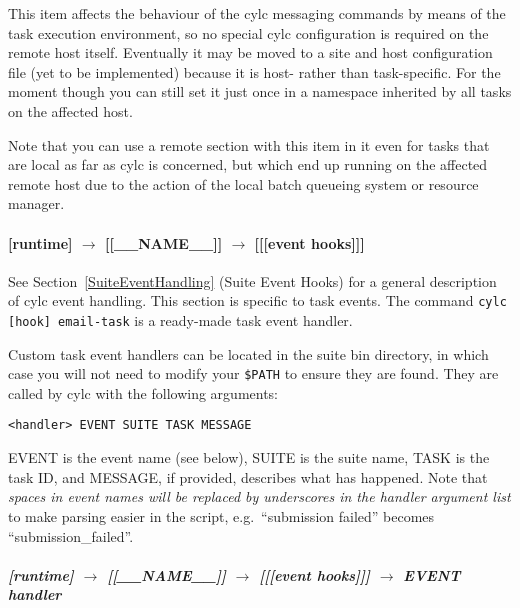 This item affects the behaviour of the cylc messaging commands by means
of the task execution environment, so no special cylc configuration is
required on the remote host itself. Eventually it may be moved to a site
and host configuration file (yet to be implemented) because it is host-
rather than task-specific. For the moment though you can still set it
just once in a namespace inherited by all tasks on the affected host.

Note that you can use a remote section with this item in it even for
tasks that are local as far as cylc is concerned, but which end up
running on the affected remote host due to the action of the local batch
queueing system or resource manager.

\paragraph[{[[[}event hooks{]]]}]{[runtime] $\rightarrow$ [[\_\_NAME\_\_]] $\rightarrow$ [[[event hooks]]]}
\label{TaskEventHandling}

See Section~\ref{SuiteEventHandling} (Suite Event Hooks) for a general
description of cylc event handling. This section is specific to task events. 
The command \lstinline=cylc [hook] email-task= is a ready-made task event 
handler. 

Custom task event handlers can be located in the suite bin directory,  
in which case you will not need to modify your \lstinline=$PATH= to ensure
they are found.  They are called by cylc with the following arguments:
\begin{lstlisting}
<handler> EVENT SUITE TASK MESSAGE
\end{lstlisting}
EVENT is the event name (see below), SUITE is the suite name, TASK 
is the task ID, and MESSAGE, if provided, describes what has happened.
Note that {\em spaces in event names will be replaced by underscores 
in the handler argument list} to make parsing easier in the script,
e.g.\ ``submission failed'' becomes ``submission\_failed''.

\subparagraph[EVENT handler]{[runtime] $\rightarrow$ [[\_\_NAME\_\_]] $\rightarrow$ [[[event hooks]]] $\rightarrow$ EVENT handler}

